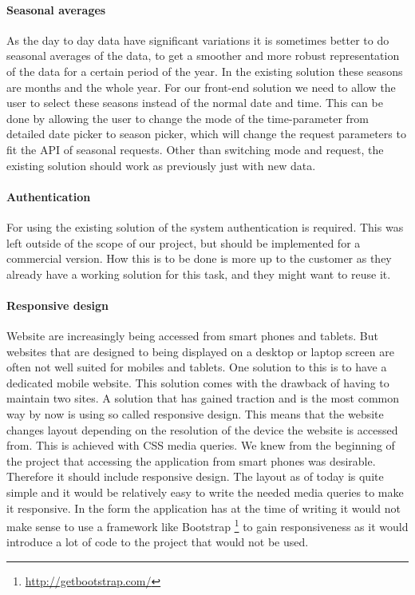 \documentclass[11pt,a4paper,titlepage,oneside]{report}
\begin{document}
\paragraph{Seasonal averages} %
As the day to day data have significant variations it is sometimes better to do seasonal averages of the data, to get a smoother and more robust representation of the data for a certain period of the year. In the existing solution these seasons are months and the whole year. For our \gls{front-end} solution we need to allow the user to select these seasons instead of the normal date and time. This can be done by allowing the user to change the mode of the time-parameter from detailed date picker to season picker, which will change the request parameters to fit the API of seasonal requests. Other than switching mode and request, the existing solution should work as previously just with new data.

\paragraph{Authentication}
For using the existing solution of the system authentication is required. This was left outside of the scope of our project, but should be implemented for a commercial version. How this is to be done is more up to the customer as they already have a working solution for this task, and they might want to reuse it.

\paragraph{Responsive design}
Website are increasingly being accessed from smart phones and tablets. But websites that are designed to being displayed on a desktop or laptop screen are often not well suited for mobiles and tablets. One solution to this is to have a dedicated mobile website. This solution comes with the drawback of having to maintain two sites. A solution that has gained traction and is the most common way by now is using so called responsive design. This means that the website changes layout depending on the resolution of the device the website is accessed from. This is achieved with \gls{CSS} media queries.
We knew from the beginning of the project that accessing the application from smart phones was desirable. Therefore it should include responsive design. The layout as of today is quite simple and it would be relatively easy to write the needed media queries to make it responsive. In the form the application has at the time of writing it would not make sense to use a framework like Bootstrap \footnote{\url{http://getbootstrap.com/}} to gain responsiveness as it would introduce a lot of code to the project that would not be used. 
\end{document}
